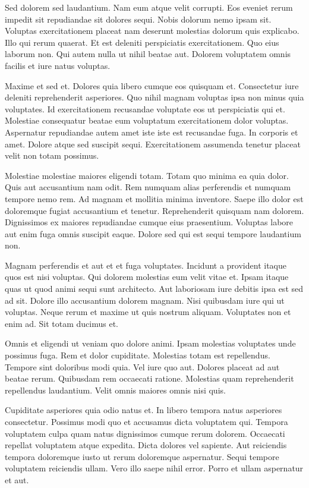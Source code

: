 Sed dolorem sed laudantium. Nam eum atque velit corrupti. Eos eveniet rerum impedit sit repudiandae sit dolores sequi. Nobis dolorum nemo ipsam sit. Voluptas exercitationem placeat nam deserunt molestias dolorum quis explicabo. Illo qui rerum quaerat. Et est deleniti perspiciatis exercitationem. Quo eius laborum non. Qui autem nulla ut nihil beatae aut. Dolorem voluptatem omnis facilis et iure natus voluptas.

Maxime et sed et. Dolores quia libero cumque eos quisquam et. Consectetur iure deleniti reprehenderit asperiores. Quo nihil magnam voluptas ipsa non minus quia voluptates. Id exercitationem recusandae voluptate eos ut perspiciatis qui et. Molestiae consequatur beatae eum voluptatum exercitationem dolor voluptas. Aspernatur repudiandae autem amet iste iste est recusandae fuga. In corporis et amet. Dolore atque sed suscipit sequi. Exercitationem assumenda tenetur placeat velit non totam possimus.

Molestiae molestiae maiores eligendi totam. Totam quo minima ea quia dolor. Quis aut accusantium nam odit. Rem numquam alias perferendis et numquam tempore nemo rem. Ad magnam et mollitia minima inventore. Saepe illo dolor est doloremque fugiat accusantium et tenetur. Reprehenderit quisquam nam dolorem. Dignissimos ex maiores repudiandae cumque eius praesentium. Voluptas labore aut enim fuga omnis suscipit eaque. Dolore sed qui est sequi tempore laudantium non.

Magnam perferendis et aut et et fuga voluptates. Incidunt a provident itaque quos est nisi voluptas. Qui dolorem molestias eum velit vitae et. Ipsam itaque quas ut quod animi sequi sunt architecto. Aut laboriosam iure debitis ipsa est sed ad sit. Dolore illo accusantium dolorem magnam. Nisi quibusdam iure qui ut voluptas. Neque rerum et maxime ut quis nostrum aliquam. Voluptates non et enim ad. Sit totam ducimus et.

Omnis et eligendi ut veniam quo dolore animi. Ipsam molestias voluptates unde possimus fuga. Rem et dolor cupiditate. Molestias totam est repellendus. Tempore sint doloribus modi quia. Vel iure quo aut. Dolores placeat ad aut beatae rerum. Quibusdam rem occaecati ratione. Molestias quam reprehenderit repellendus laudantium. Velit omnis maiores omnis nisi quis.

Cupiditate asperiores quia odio natus et. In libero tempora natus asperiores consectetur. Possimus modi quo et accusamus dicta voluptatem qui. Tempora voluptatem culpa quam natus dignissimos cumque rerum dolorem. Occaecati repellat voluptatem atque expedita. Dicta dolores vel sapiente. Aut reiciendis tempora doloremque iusto ut rerum doloremque aspernatur. Sequi tempore voluptatem reiciendis ullam. Vero illo saepe nihil error. Porro et ullam aspernatur et aut.

